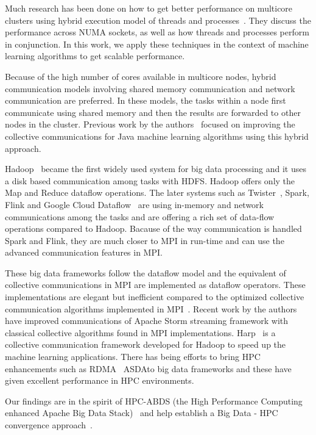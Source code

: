 \documentclass[10pt, conference, compsocconf]{IEEEtran}
\begin{document}
Much research has been done on how to get better performance on multicore clusters using hybrid execution model of threads and processes~\cite{chorley2010performance, rabenseifner2009hybrid, camp2011streamline}. They discuss the performance across NUMA sockets, as well as how threads and processes perform in conjunction. In this work, we apply these techniques in the context of machine learning algorithms to get scalable performance.

Because of the high number of cores available in multicore nodes, hybrid communication models involving shared memory communication and network communication are preferred. In these models, the tasks within a node first communicate using shared memory and then the results are forwarded to other nodes in the cluster. Previous work by the authors~\cite{hpc2016:spidaljava} focused on improving the collective communications for Java machine learning algorithms using this hybrid approach. 

Hadoop~\cite{lam2010hadoop} became the first widely used system for big data processing and it uses a disk based communication among tasks with HDFS. Hadoop offers only the Map and Reduce  dataflow operations. The later systems such as Twister~\cite{Ekanayake:2010:TRI:1851476.1851593}, Spark, Flink and Google Cloud Dataflow~\cite{akidau2015dataflow} are using in-memory and network communications among the tasks and are offering a rich set of data-flow operations compared to Hadoop. Bacause of the way communication is handled Spark and Flink, they are much closer to \ac{MPI} in run-time and can use the advanced communication features in MPI. 

These big data frameworks follow the  dataflow model and the equivalent of collective communications in \ac{MPI} are implemented as  dataflow operators. These implementations are elegant but inefficient compared to the optimized collective communication algorithms implemented in MPI~\cite{pjevsivac2007performance, thakur2005optimization}. Recent work by the authors~\cite{kamburugamuve2016towards} have improved communications of Apache Storm streaming framework with classical collective algorithms found in \ac{MPI} implementations. Harp~\cite{zhang2015harp} is a collective communication framework developed for Hadoop to speed up the machine learning applications. There has being efforts to bring HPC enhancements such as RDMA~\cite{lu2013high} ASDAto big data frameworks and these have given excellent performance in HPC environments.

Our findings are in the spirit of HPC-ABDS (the High Performance Computing enhanced Apache Big Data Stack)~\cite{kaleidoescope} and help establish a Big Data - HPC convergence approach~\cite{fox1858big}.
\end{document}
